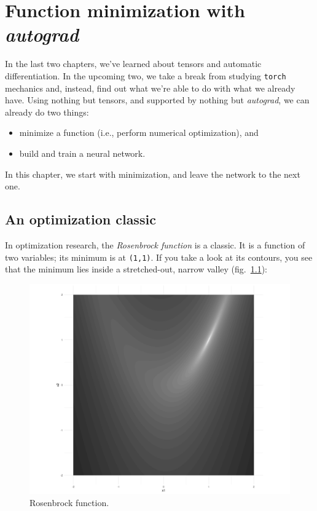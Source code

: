 \documentclass[
  letterpaper,
]{krantz}
\begin{document}
\hypertarget{sec:optim-1}{%
\chapter{\texorpdfstring{Function minimization with
\emph{autograd}}{Function minimization with autograd}}\label{sec:optim-1}}

In the last two chapters, we've learned about tensors and automatic
differentiation. In the upcoming two, we take a break from studying
\texttt{torch} mechanics and, instead, find out what we're able to do
with what we already have. Using nothing but tensors, and supported by
nothing but \emph{autograd}, we can already do two things:

\begin{itemize}
\item
  minimize a function (i.e., perform numerical optimization), and
\item
  build and train a neural network.
\end{itemize}

In this chapter, we start with minimization, and leave the network to
the next one.

\hypertarget{an-optimization-classic}{%
\section{An optimization classic}\label{an-optimization-classic}}

In optimization research, the \emph{Rosenbrock
function} is a classic. It is a function of two variables; its minimum
is at \texttt{(1,1)}. If you take a look at its contours, you see that
the minimum lies inside a stretched-out, narrow valley
(fig.~\ref{fig-optim-1-rosenbrock}):

\begin{figure}[H]

{\centering \includegraphics{images/optim-1-rosenbrock.png}

}

\caption{\label{fig-optim-1-rosenbrock}Rosenbrock function.}

\end{figure}
\end{document}
